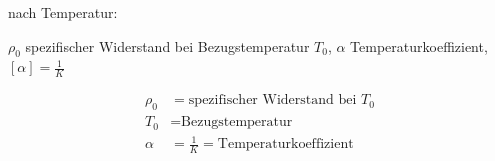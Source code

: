 nach Temperatur:

$\rho_0$ spezifischer Widerstand bei Bezugstemperatur $T_0$, $\alpha$ Temperaturkoeffizient, $[\alpha] = \frac{1}{K}$

\vspace{-1mm}
\begin{minipage}{0.49\linewidth}
    \begin{footnotesize}
        \begin{center}
        \end{center}
    \end{footnotesize}
\end{minipage}
\begin{minipage}{0.5\linewidth}
    \begin{scriptsize}
        \begin{center}
            \begin{align*}
                \rho_0 &= \text{spezifischer Widerstand bei } T_0
                \\T_0 &= \text{Bezugstemperatur}
                \\\alpha &= \frac{1}{K} =\text{Temperaturkoeffizient}
            \end{align*}
        \end{center}
    \end{scriptsize}
\end{minipage}
\vspace{1mm}
